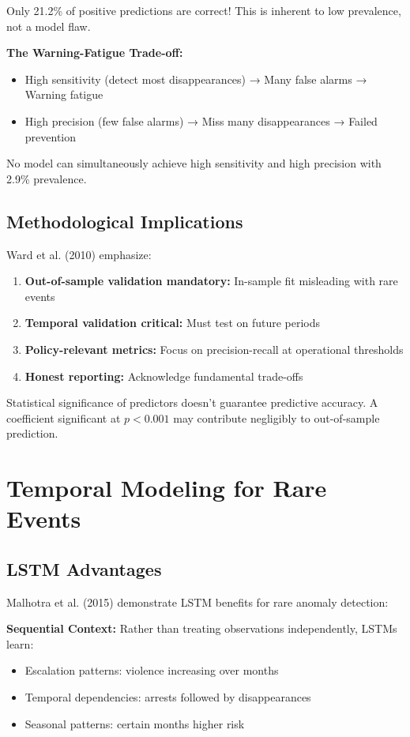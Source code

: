 \documentclass{article}
\begin{document}
Only 21.2\% of positive predictions are correct! This is inherent to low prevalence, not a model flaw.

\textbf{The Warning-Fatigue Trade-off:}
\begin{itemize}
    \item High sensitivity (detect most disappearances) → Many false alarms → Warning fatigue
    \item High precision (few false alarms) → Miss many disappearances → Failed prevention
\end{itemize}

No model can simultaneously achieve high sensitivity and high precision with 2.9\% prevalence.

\subsection{Methodological Implications}

Ward et al. (2010) emphasize:
\begin{enumerate}
    \item \textbf{Out-of-sample validation mandatory:} In-sample fit misleading with rare events
    \item \textbf{Temporal validation critical:} Must test on future periods
    \item \textbf{Policy-relevant metrics:} Focus on precision-recall at operational thresholds
    \item \textbf{Honest reporting:} Acknowledge fundamental trade-offs
\end{enumerate}

Statistical significance of predictors doesn't guarantee predictive accuracy. A coefficient significant at $p < 0.001$ may contribute negligibly to out-of-sample prediction.

\section{Temporal Modeling for Rare Events}

\subsection{LSTM Advantages}

Malhotra et al. (2015) demonstrate LSTM benefits for rare anomaly detection:

\textbf{Sequential Context:} Rather than treating observations independently, LSTMs learn:
\begin{itemize}
    \item Escalation patterns: violence increasing over months
    \item Temporal dependencies: arrests followed by disappearances
    \item Seasonal patterns: certain months higher risk
\end{itemize}
\end{document}

